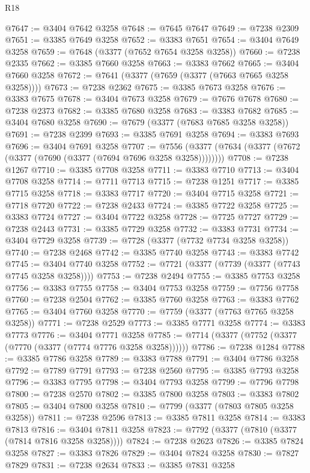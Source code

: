 \begin{lexlean}{R18}
\begin{coremodule}
@7647 := @3404 @7642 @3258
@7648 := @7645 @7647
@7649 := @7238 @2309
@7651 := @3385 @7649 @3258
@7652 := @3383 @7651
@7654 := @3404 @7649 @3258
@7659 := @7648 (@3377 (@7652 @7654 @3258 @3258))
@7660 := @7238 @2335
@7662 := @3385 @7660 @3258
@7663 := @3383 @7662
@7665 := @3404 @7660 @3258
@7672 := @7641 (@3377 (@7659 (@3377 (@7663 @7665 @3258 @3258))))
@7673 := @7238 @2362
@7675 := @3385 @7673 @3258
@7676 := @3383 @7675
@7678 := @3404 @7673 @3258
@7679 := @7676 @7678
@7680 := @7238 @2373
@7682 := @3385 @7680 @3258
@7683 := @3383 @7682
@7685 := @3404 @7680 @3258
@7690 := @7679 (@3377 (@7683 @7685 @3258 @3258))
@7691 := @7238 @2399
@7693 := @3385 @7691 @3258
@7694 := @3383 @7693
@7696 := @3404 @7691 @3258
@7707 := @7556 (@3377 (@7634 (@3377 (@7672 (@3377 (@7690 (@3377 (@7694 @7696 @3258 @3258))))))))
@7708 := @7238 @1267
@7710 := @3385 @7708 @3258
@7711 := @3383 @7710
@7713 := @3404 @7708 @3258
@7714 := @7711 @7713
@7715 := @7238 @1251
@7717 := @3385 @7715 @3258
@7718 := @3383 @7717
@7720 := @3404 @7715 @3258
@7721 := @7718 @7720
@7722 := @7238 @2433
@7724 := @3385 @7722 @3258
@7725 := @3383 @7724
@7727 := @3404 @7722 @3258
@7728 := @7725 @7727
@7729 := @7238 @2443
@7731 := @3385 @7729 @3258
@7732 := @3383 @7731
@7734 := @3404 @7729 @3258
@7739 := @7728 (@3377 (@7732 @7734 @3258 @3258))
@7740 := @7238 @2468
@7742 := @3385 @7740 @3258
@7743 := @3383 @7742
@7745 := @3404 @7740 @3258
@7752 := @7721 (@3377 (@7739 (@3377 (@7743 @7745 @3258 @3258))))
@7753 := @7238 @2494
@7755 := @3385 @7753 @3258
@7756 := @3383 @7755
@7758 := @3404 @7753 @3258
@7759 := @7756 @7758
@7760 := @7238 @2504
@7762 := @3385 @7760 @3258
@7763 := @3383 @7762
@7765 := @3404 @7760 @3258
@7770 := @7759 (@3377 (@7763 @7765 @3258 @3258))
@7771 := @7238 @2529
@7773 := @3385 @7771 @3258
@7774 := @3383 @7773
@7776 := @3404 @7771 @3258
@7785 := @7714 (@3377 (@7752 (@3377 (@7770 (@3377 (@7774 @7776 @3258 @3258))))))
@7786 := @7238 @1284
@7788 := @3385 @7786 @3258
@7789 := @3383 @7788
@7791 := @3404 @7786 @3258
@7792 := @7789 @7791
@7793 := @7238 @2560
@7795 := @3385 @7793 @3258
@7796 := @3383 @7795
@7798 := @3404 @7793 @3258
@7799 := @7796 @7798
@7800 := @7238 @2570
@7802 := @3385 @7800 @3258
@7803 := @3383 @7802
@7805 := @3404 @7800 @3258
@7810 := @7799 (@3377 (@7803 @7805 @3258 @3258))
@7811 := @7238 @2596
@7813 := @3385 @7811 @3258
@7814 := @3383 @7813
@7816 := @3404 @7811 @3258
@7823 := @7792 (@3377 (@7810 (@3377 (@7814 @7816 @3258 @3258))))
@7824 := @7238 @2623
@7826 := @3385 @7824 @3258
@7827 := @3383 @7826
@7829 := @3404 @7824 @3258
@7830 := @7827 @7829
@7831 := @7238 @2634
@7833 := @3385 @7831 @3258

\end{coremodule}
\end{lexlean}
